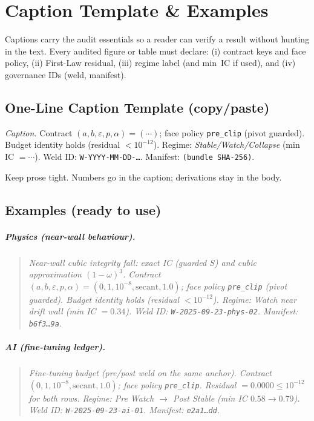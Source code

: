 \chapter{Caption Template \& Examples}
\label{apx:captionsB}

Captions carry the audit essentials so a reader can verify a result without hunting in the text. Every audited figure or table must declare: (i) contract keys and face policy, (ii) First-Law residual, (iii) regime label (and min~IC if used), and (iv) governance IDs (weld, manifest).

\section{One-Line Caption Template (copy/paste)}
\label{sec:captions-template}

\begin{callout}[Template]
\textit{Caption.} Contract \((a,b,\varepsilon,p,\alpha)=(\cdots)\); face policy \texttt{pre\_clip} (pivot guarded).
Budget identity holds (residual \(<10^{-12}\)).
Regime: \emph{Stable/Watch/Collapse} (min IC \(=\cdots\)).
Weld ID: \texttt{W-YYYY-MM-DD-\dots}. Manifest: \texttt{(bundle SHA-256)}.
\end{callout}

\noindent Keep prose tight. Numbers go in the caption; derivations stay in the body.

\section{Examples (ready to use)}
\label{sec:captions-examples}

\paragraph{Physics (near-wall behaviour).}
\begin{quote}\itshape
Near-wall cubic integrity fall: exact IC (guarded \(S\)) and cubic approximation \((1-\omega)^3\).
Contract \((a,b,\varepsilon,p,\alpha)=(0,1,10^{-8},\text{secant},1.0)\); face policy \texttt{pre\_clip} (pivot guarded).
Budget identity holds (residual \(<10^{-12}\)).
Regime: \emph{Watch} near drift wall (min IC \(=0.34\)).
Weld ID: \texttt{W-2025-09-23-phys-02}. Manifest: \texttt{b6f3…9a}.
\end{quote}

\paragraph{AI (fine-tuning ledger).}
\begin{quote}\itshape
Fine-tuning budget (pre/post weld on the same anchor).
Contract \((0,1,10^{-8},\text{secant},1.0)\); face policy \texttt{pre\_clip}.
Residual \(=0.0000\le 10^{-12}\) for both rows.
Regime: \emph{Pre} Watch \(\to\) \emph{Post} Stable (min IC \(0.58\to0.79\)).
Weld ID: \texttt{W-2025-09-23-ai-01}. Manifest: \texttt{e2a1…dd}.
\end{quote}

